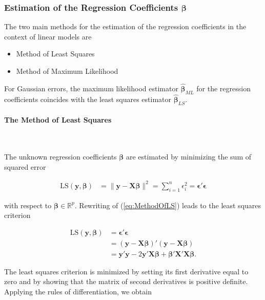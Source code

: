 \documentclass[10pt,a4paper]{article}
\newcommand{\subsubsubsection}[1]{\paragraph{#1}\mbox{}\\}
\begin{document}
\subsubsection{Estimation of the Regression Coefficients $\boldsymbol{\beta}$}

The two main methods for the estimation of the regression coefficients in the context of linear models are

\begin{itemize}
	\item Method of Least Squares
	\item Method of Maximum Likelihood
\end{itemize}	

For Gaussian errors, the maximum likelihood estimator $\boldsymbol{\hat{\beta}}_{ML}$ for the regression coefficients coincides with the least squares estimator $\boldsymbol{\hat{\beta}}_{LS}$. 

\subsubsubsection{The Method of Least Squares} \label{subsubsubsec:Method-of-LS}

The unknown regression coefficients $\boldsymbol{\beta}$ are estimated by minimizing the sum of squared error

\begin{align} \label{eq:MethodOfLS} 
	\text{LS}(\boldsymbol{y}, \boldsymbol{\beta}) &=  \lVert \boldsymbol{y} - \boldsymbol{X} \boldsymbol{\beta} \rVert^2 = \sum_{i=1}^n\epsilon_i^2 = \boldsymbol{\epsilon}'\boldsymbol{\epsilon}
\end{align}

with respect to $\boldsymbol{\beta} \in \mathbb{R}^p$. \cite{friedman2001elements} Rewriting of (\ref{eq:MethodOfLS}) leads to the least squares criterion

\begin{align} \label{eq:LS_derivation}
	\text{LS}(\boldsymbol{y}, \boldsymbol{\beta}) &= \boldsymbol{\epsilon}'\boldsymbol{\epsilon} \\
								 				  &= (\boldsymbol{y} - \boldsymbol{X} \boldsymbol{\beta})'(\boldsymbol{y} - \boldsymbol{X} \boldsymbol{\beta}) \\ 
				 								  &= \boldsymbol{y}'\boldsymbol{y} - 2\boldsymbol{y}'\boldsymbol{X} \boldsymbol{\beta} + \boldsymbol{\beta}' \boldsymbol{X}'\boldsymbol{X} \boldsymbol{\beta}.
\end{align}

The least squares criterion is minimized by setting its first derivative equal to zero and by showing that the matrix of second derivatives is positive definite. Applying the rules of differentiation, we obtain
\end{document}
